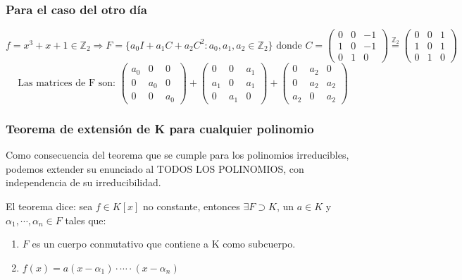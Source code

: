 \documentclass[10pt,a4paper,openright]{book}
\theoremstyle{break}
\begin{document}
\subsubsection*{Para el caso del otro día}
$$f=x^3+x+1\in \mathbb Z_2\Rightarrow F=\{a_0I+a_1C+a_2C^2: a_0,a_1,a_2\in \mathbb Z_2\}\mbox{ donde } C=\left(\begin{array}{ccc} 0 & 0 & -1 \\ 1 & 0 & -1 \\0 & 1 & 0 \end{array}\right)\stackrel{\mathbb Z_2}{=}\left(\begin{array}{ccc} 0 & 0 & 1 \\ 1 & 0 & 1 \\0 & 1 & 0 \end{array}\right)$$
$$\mbox{Las matrices de F son: }\left(\begin{array}{ccc} a_0 & 0 & 0 \\ 0 & a_0 & 0 \\0 & 0 & a_0 \end{array}\right)+\left(\begin{array}{ccc} 0 & 0 & a_1 \\ a_1 & 0 & a_1 \\0 & a_1 & 0 \end{array}\right)+\left(\begin{array}{ccc} 0 & a_2 & 0 \\ 0 & a_2 & a_2 \\a_2 & 0 & a_2 \end{array}\right)$$

\subsubsection*{Teorema de extensión de K para cualquier polinomio}
Como consecuencia del teorema que se cumple para los polinomios irreducibles, podemos extender su enunciado al TODOS LOS POLINOMIOS, con independencia de su irreducibilidad.\par
El teorema dice: sea $f\in K[x]$ no constante, entonces $\exists F\supset K$, un $a\in K$ y $\alpha_1, \cdots, \alpha_n\in F$ tales que:
\begin{enumerate}
\item $F$ es un cuerpo conmutativo que contiene a K como subcuerpo.
\item $f(x)=a(x-\alpha_1)\cdot \cdots \cdot (x-\alpha_n)$
\end{enumerate}
\end{document}
